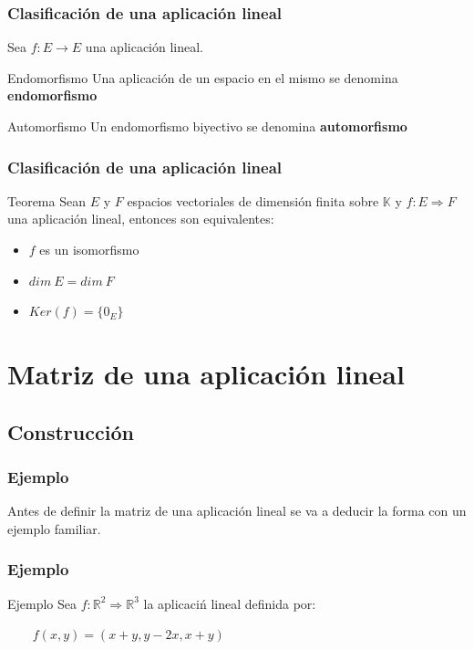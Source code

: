 \documentclass{beamer}
\begin{document}
 \begin{frame}
  \frametitle{Clasificaci\'on de una aplicaci\'on lineal}
  Sea $f:E\rightarrow E$ una aplicaci\'on lineal.
 \begin{block}{Endomorfismo} 
Una aplicaci\'on de un espacio en el mismo se denomina \textbf{endomorfismo} 
\end{block} 
 \begin{block}{Automorfismo} 
Un endomorfismo biyectivo  se denomina \textbf{automorfismo} 
\end{block} 
  \end{frame}

\begin{frame}
  \frametitle{Clasificaci\'on de una aplicaci\'on lineal}
 \begin{block}{Teorema} 
Sean $E$ y $F$ espacios vectoriales de dimensi\'on finita sobre $\mathbb{K}$ y $f:E\Longrightarrow F$ una aplicaci\'on lineal, entonces son equivalentes:
\begin{itemize}
\item $f$ es un isomorfismo
\item $dim\ E = dim\ F$ 
\item $Ker(f) = \{0_E\}$
\end{itemize}
\end{block} 
  \end{frame}



\section{Matriz de una aplicaci\'on lineal}
\subsection{Construcci\'on}

\begin{frame}
  \frametitle{Ejemplo}
  Antes de definir la matriz de una aplicaci\'on lineal se va a deducir la forma con un ejemplo familiar.
  \end{frame}
  
  
  
  \begin{frame}
  \frametitle{Ejemplo}
 \begin{block}{Ejemplo} 
Sea  $f:\mathbb R^2 \Longrightarrow \mathbb R^3$ la aplicaci\'n lineal definida por:

$\ \ \ \ \ \ \ \ \ f(x,y) = (x+y, y-2x, x+y)$
\end{block} 
  \end{frame}
\end{document}
